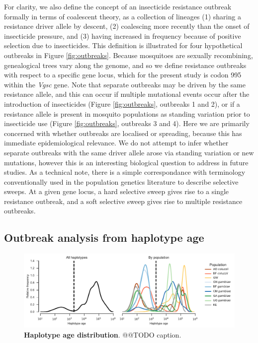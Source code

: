 \documentclass[a4paper,11pt,abstracton,hidelinks]{scrartcl}
\begin{document}
%
For clarity, we also define the concept of an insecticide resistance outbreak formally in terms of coalescent theory, as a collection of lineages (1) sharing a resistance driver allele by descent, (2) coalescing more recently than the onset of insecticide pressure, and (3) having increased in frequency because of positive selection due to insecticides. 
%
This definition is illustrated for four hypothetical outbreaks in Figure \ref{fig:outbreaks}.
%
Because mosquitoes are sexually recombining, genealogical trees vary along the genome, and so we define resistance outbreaks with respect to a specific gene locus, which for the present study is codon 995 within the \textit{Vgsc} gene.
%
Note that separate outbreaks may be driven by the same resistance allele, and this can occur if multiple mutational events occur after the introduction of insecticides (Figure \ref{fig:outbreaks}, outbreaks 1 and 2), or if a resistance allele is present in mosquito populations as standing variation prior to insecticide use (Figure \ref{fig:outbreaks}, outbreaks 3 and 4).
%
Here we are primarily concerned with whether outbreaks are localised or spreading, because this has immediate epidemiological relevance.
%
We do not attempt to infer whether separate outbreaks with the same driver allele arose via standing variation or new mutations, however this is an interesting biological question to address in future studies.
%
As a technical note, there is a simple correspondance with terminology conventionally used in the population genetics literature to describe selective sweeps.
%
At a given gene locus, a hard selective sweep gives rise to a single resistance outbreak, and a soft selective sweep gives rise to multiple resistance outbreaks.


\subsection*{Outbreak analysis from haplotype age}


%
\begin{figure}[!b]
  \includegraphics[width=1.1\linewidth,center]{artwork/haplotype_age_dist.pdf}
  \caption{\textbf{Haplotype age distribution}. @@TODO caption.}
  \label{fig:age_hist}
\end{figure}
\end{document}
